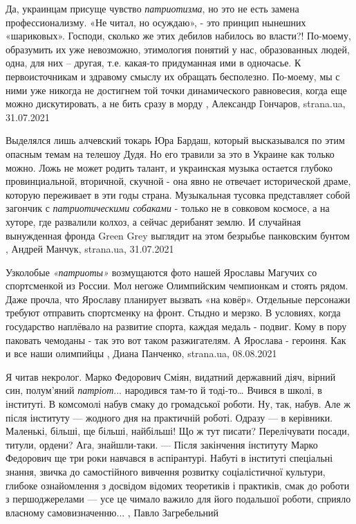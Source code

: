 Да, украинцам присуще чувство \emph{патриотизма}, но это не есть замена
профессионализму. «Не читал, но осуждаю», - это принцип нынешних «шариковых».
Господи, сколько же этих дебилов набилось во власти?! По-моему, образумить их
уже невозможно, этимология понятий у нас, образованных людей, одна, для них –
другая, т.е. какая-то придуманная ими в одночасье.  К первоисточникам и
здравому смыслу их обращать бесполезно. По-моему, мы с ними уже никогда не
достигнем той точки динамического равновесия, когда еще можно дискутировать, а
не бить сразу в морду
, 
Александр Гончаров, strana.ua, 31.07.2021

Выделялся лишь алчевский токарь Юра Бардаш, который высказывался по этим
опасным темам на телешоу Дудя. Но его травили за это в Украине как только
можно.  Ложь не может родить талант, и украинская музыка остается глубоко
провинциальной, вторичной, скучной - она явно не отвечает исторической драме,
которую переживает в эти годы страна. Музыкальная тусовка представляет собой
загончик с \emph{патриотическими собаками} - только не в совковом космосе, а на
хуторе, где развалили колхоз, а сейчас дерибанят землю.  И случайная
вынужденная фронда Green Grey выглядит на этом безрыбье панковским бунтом
, 
Андрей Манчук, strana.ua, 31.07.2021

Узколобые \emph{«патриоты»} возмущаются фото нашей Ярославы Магучих со
спортсменкой из России. Мол негоже Олимпийским чемпионкам и стоять рядом.  Даже
прочла, что Ярославу планирует вызвать «на ковёр». Отдельные персонажи требуют
отправить спортсменку на фронт.  Стыдно и мерзко. В условиях, когда государство
наплёвало на развитие спорта, каждая медаль - подвиг.  Кому в пору паковать
чемоданы - так это вот таком разжигателям.  А Ярослава - героиня. Как и все
наши олимпийцы
, 
Диана Панченко, strana.ua, 08.08.2021

Я читав некролог. Марко Федорович Сміян, видатний державний діяч, вірний син,
полум’яний \emph{патріот}... народився там-то й тоді-то… Вчився в школі, в інституті. В
комсомолі набув смаку до громадської роботи. Ну, так, набув. Але ж після
інституту — жодного дня на практичній роботі. Одразу — в керівники. Маленькі,
більші, ще більші, найбільші! Що ж тут писати? Перелічувати посади, титули,
ордени? Ага, знайшли-таки. — Після закінчення інституту Марко Федорович ще три
роки навчався в аспірантурі. Набуті в інституті спеціальні знання, звичка до
самостійного вивчення розвитку соціалістичної культури, глибоке ознайомлення з
досвідом відомих теоретиків і практиків, смак до роботи з першоджерелами — усе
це чимало важило для його подальшої роботи, сприяло власному самовизначенню...
, Павло Загребельний 

